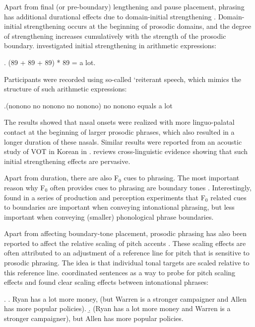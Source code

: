 \documentclass[preprint,review,12pt,authoryear,times]{elsarticle}
\begin{document}
Apart from final (or pre-boundary) lengthening and pause placement, phrasing has additional durational effects due to domain-initial strengthening  \citep{fouge97, lavoi01, cho02, keati03,keati06,cho07,cho11,cho16}. Domain-initial strengthening occurs at the beginning of prosodic domains, and the degree of strengthening increases cumulatively with the strength of the prosodic boundary.  \citet{fouge97} investigated initial strengthening in arithmetic expressions:

\ex. (89 + 89 + 89) * 89 = a lot. \label{2arithm}

\noindent Participants were recorded using so-called `reiterant speech, which  mimics the structure of such arithmetic expressions:

\ex.(nonono no nonono no nonono) no nonono equals a lot

\noindent The results showed that nasal onsets were realized with more linguo-palatal contact at the beginning of larger prosodic phrases, which also resulted in a longer duration of these nasals. Similar results were reported from an acoustic study of VOT in Korean in \citet{Jun93}.  \citet{keati03} reviews cross-linguistic evidence showing that such initial strengthening effects are pervasive.

Apart from duration, there are also F$_0$ cues to phrasing. The most important reason why F$_0$ often provides cues to phrasing are boundary tones \citep[][i.a.]{pierr80,ladd08}. Interestingly, \citet{gollr13} found in a series of production and perception experiments that F$_0$ related cues to boundaries are important when conveying intonational phrasing, but less important when conveying (smaller) phonological phrase boundaries. 

Apart from affecting boundary-tone placement, prosodic phrasing has also been reported to affect the relative scaling of pitch accents \citep{ladd88}. These scaling effects are  often attributed to an adjustment of a reference line for pitch that is sensitive to prosodic phrasing. The idea is that individual tonal targets are scaled relative to this reference line. \citet{ladd88} coordinated sentences as a way to probe for pitch scaling effects and found clear scaling effects between intonational phrases:

\ex.\label{laddoo}
\a. Ryan has a lot more money, (but Warren is a stronger campaigner and Allen has more popular policies).\label{laddoa}
\b. (Ryan has a lot more money and Warren is a stronger campaigner), but Allen has more popular policies.\label{laddob}
\end{document}
